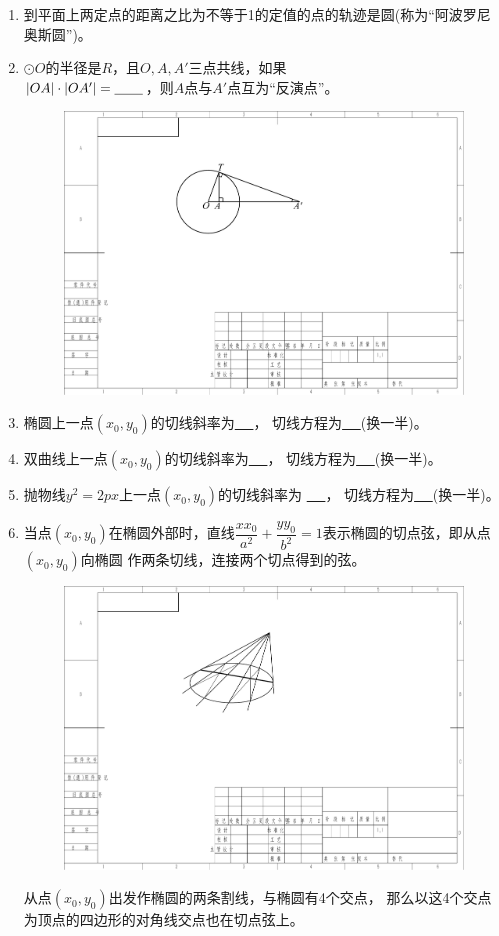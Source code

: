 \documentclass{article}
\newif\ifte
\begin{document}
\begin{multicols}{2}
\begin{enumerate}[leftmargin=20pt]
\item 到平面上两定点的距离之比为不等于1的定值的点的轨迹是圆(称为“阿波罗尼奥斯圆”)。

\item $ \odot O $的半径是$ R $，且$ O,A,A' $三点共线，如果 \\ 
$ |OA|\cdot |OA'|=\underline{\ \ifte R^2\else 
 \hspace{0.5cm} \fi\ } $，则$ A $点与$ A' $点互为“反演点”。
\begin{figure}[H]
    \centering
    \includegraphics[width=0.5\linewidth]{圆的反演点}
\end{figure}

\item 椭圆上一点$ (x_0,y_0) $的切线斜率为\underline{\ \ifte 
    $ -\dfrac{b^2x_0}{a^2y_0} $\else \hspace{1cm} \fi\ }，
切线方程为\underline{\ \ifte $ \dfrac{xx_0}{a^2}+\dfrac{yy_0}{b^2}=1 $
    \else \hspace{2cm} \fi\ }(换一半)。

\item 双曲线上一点$ (x_0,y_0) $的切线斜率为\underline{\ \ifte
    $ \dfrac{b^2x_0}{a^2y_0} $  \else \hspace{1cm} \fi\ }，
切线方程为\underline{\ \ifte $ \dfrac{xx_0}{a^2}-
    \dfrac{yy_0}{b^2}=1 $\else \hspace{2cm} \fi\ }(换一半)。

\item 抛物线$ y^2=2px $上一点$ (x_0,y_0) $的切线斜率为
\underline{\ \ifte $ \dfrac{p}{y_0} $\else \hspace{1cm} \fi\ }，
切线方程为\underline{\ \ifte $ yy_0=p(x+x_0) $
    \else \hspace{2cm} \fi\ }(换一半)。

\item 当点$ (x_0,y_0) $在椭圆外部时，直线$ \dfrac{xx_0}{a^2}+
\dfrac{yy_0}{b^2}=1 $表示椭圆的切点弦，即从点$ (x_0,y_0) $向椭圆
作两条切线，连接两个切点得到的弦。
\begin{figure}[H]
    \centering
    \includegraphics[width=0.4\linewidth]{椭圆-极点极线}
\end{figure}
从点$ (x_0,y_0) $出发作椭圆的两条割线，与椭圆有4个交点，
那么以这4个交点为顶点的四边形的对角线交点也在切点弦上。


\end{enumerate}
\end{multicols}
\end{document}
